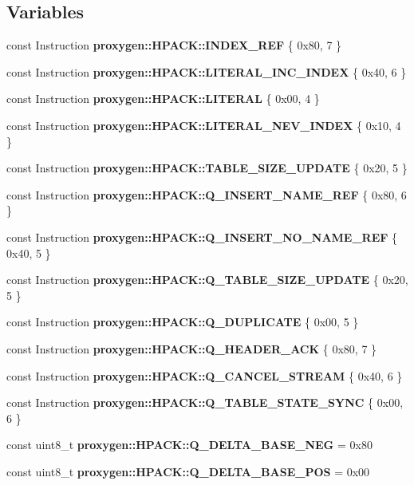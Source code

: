 \subsection*{Variables}
\begin{DoxyCompactItemize}
\item 
const Instruction {\bf proxygen\+::\+H\+P\+A\+C\+K\+::\+I\+N\+D\+E\+X\+\_\+\+R\+EF} \{ 0x80, 7 \}
\item 
const Instruction {\bf proxygen\+::\+H\+P\+A\+C\+K\+::\+L\+I\+T\+E\+R\+A\+L\+\_\+\+I\+N\+C\+\_\+\+I\+N\+D\+EX} \{ 0x40, 6 \}
\item 
const Instruction {\bf proxygen\+::\+H\+P\+A\+C\+K\+::\+L\+I\+T\+E\+R\+AL} \{ 0x00, 4 \}
\item 
const Instruction {\bf proxygen\+::\+H\+P\+A\+C\+K\+::\+L\+I\+T\+E\+R\+A\+L\+\_\+\+N\+E\+V\+\_\+\+I\+N\+D\+EX} \{ 0x10, 4 \}
\item 
const Instruction {\bf proxygen\+::\+H\+P\+A\+C\+K\+::\+T\+A\+B\+L\+E\+\_\+\+S\+I\+Z\+E\+\_\+\+U\+P\+D\+A\+TE} \{ 0x20, 5 \}
\item 
const Instruction {\bf proxygen\+::\+H\+P\+A\+C\+K\+::\+Q\+\_\+\+I\+N\+S\+E\+R\+T\+\_\+\+N\+A\+M\+E\+\_\+\+R\+EF} \{ 0x80, 6 \}
\item 
const Instruction {\bf proxygen\+::\+H\+P\+A\+C\+K\+::\+Q\+\_\+\+I\+N\+S\+E\+R\+T\+\_\+\+N\+O\+\_\+\+N\+A\+M\+E\+\_\+\+R\+EF} \{ 0x40, 5 \}
\item 
const Instruction {\bf proxygen\+::\+H\+P\+A\+C\+K\+::\+Q\+\_\+\+T\+A\+B\+L\+E\+\_\+\+S\+I\+Z\+E\+\_\+\+U\+P\+D\+A\+TE} \{ 0x20, 5 \}
\item 
const Instruction {\bf proxygen\+::\+H\+P\+A\+C\+K\+::\+Q\+\_\+\+D\+U\+P\+L\+I\+C\+A\+TE} \{ 0x00, 5 \}
\item 
const Instruction {\bf proxygen\+::\+H\+P\+A\+C\+K\+::\+Q\+\_\+\+H\+E\+A\+D\+E\+R\+\_\+\+A\+CK} \{ 0x80, 7 \}
\item 
const Instruction {\bf proxygen\+::\+H\+P\+A\+C\+K\+::\+Q\+\_\+\+C\+A\+N\+C\+E\+L\+\_\+\+S\+T\+R\+E\+AM} \{ 0x40, 6 \}
\item 
const Instruction {\bf proxygen\+::\+H\+P\+A\+C\+K\+::\+Q\+\_\+\+T\+A\+B\+L\+E\+\_\+\+S\+T\+A\+T\+E\+\_\+\+S\+Y\+NC} \{ 0x00, 6 \}
\item 
const uint8\+\_\+t {\bf proxygen\+::\+H\+P\+A\+C\+K\+::\+Q\+\_\+\+D\+E\+L\+T\+A\+\_\+\+B\+A\+S\+E\+\_\+\+N\+EG} = 0x80
\item 
const uint8\+\_\+t {\bf proxygen\+::\+H\+P\+A\+C\+K\+::\+Q\+\_\+\+D\+E\+L\+T\+A\+\_\+\+B\+A\+S\+E\+\_\+\+P\+OS} = 0x00
\item 

\end{DoxyCompactItemize}
